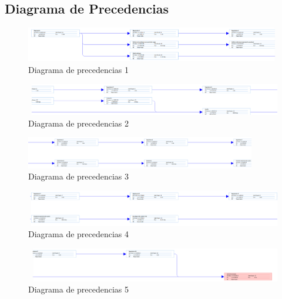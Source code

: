 			\FloatBarrier
			\clearpage

		\subsection{Diagrama de Precedencias}
			\begin{figure}[!htbp]
				\centering
				\includegraphics[scale=.4, angle=90]{fig/Red1}
				\caption{Diagrama de precedencias 1}
			\end{figure}

			\begin{figure}[!htbp]
				\centering
				\includegraphics[scale=.4, angle=90]{fig/Red2}
				\caption{Diagrama de precedencias 2}
			\end{figure}

			\begin{figure}[!htbp]
				\centering
				\includegraphics[scale=.4, angle=90]{fig/Red3}
				\caption{Diagrama de precedencias 3}
			\end{figure}

			\begin{figure}[!htbp]
				\centering
				\includegraphics[scale=.4, angle=90]{fig/Red4}
				\caption{Diagrama de precedencias 4}
			\end{figure}

			\begin{figure}[!htbp]
				\centering
				\includegraphics[scale=.4, angle=90]{fig/Red5}
				\caption{Diagrama de precedencias 5}
			\end{figure}

